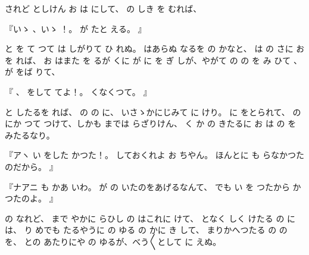 されど
としけん
お
は
にして、
の
しき
を
むれば、

『いゝ
、いゝ
！。
が
たと
える。
』

と
を
て
つて
は
しがりて
ひ
れぬ。
はあらぬ
なるを
の
かなと、
は
の
さに
お
を
れば、
お
はまた
を
るが
くに
が
に
を
ぎ
しが、やがて
の
の
を
み
ひて
、
が
をば
りて、

『
、
をして
てよ！。
くなくつて。
』

と
したるを
れば、
の
の
に、
いさゝかにじみて
に
けり。
に
をとられて、
の
にか
つて
つけて、しかも
までは
らざりけん、
く
か
の
きたるに
お
は
の
を
みたるなり。

『アヽ
い
をした
かつた！。
しておくれよ
お
ちやん。
ほんとに
も
らなかつたのだから。
』

『ナアニ
も
かあ
いわ。
が
の
いたのをあげるなんて、
でも
い
を
つたから
かつたのよ。
』

の
なれど、
まで
やかに
らひし
の
はこれに
けて、
となく
しく
けたる
の
には、
り
めでも
たるやうに
の
ゆる
の
かに
き
して、
まりかへつたる
の
の
を、
との
あたりにや
の
ゆるが、べう〳〵として
に
えぬ。

